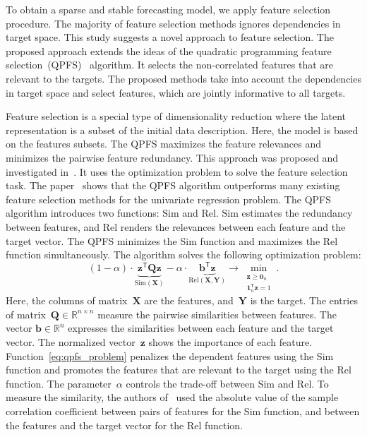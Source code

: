 \documentclass[preprint,authoryear,12pt]{elsarticle}
\theoremstyle{definition}
\newcommand{\bz}{\mathbf{z}}
\newcommand{\bb}{\mathbf{b}}
\newcommand{\bY}{\mathbf{Y}}
\newcommand{\bX}{\mathbf{X}}
\newcommand{\bQ}{\mathbf{Q}}
\newcommand{\bbR}{\mathbb{R}}
\newcommand{\T}{\mathsf{T}}
\newcommand{\bnu}{\boldsymbol{\nu}}
\newcommand{\bOne}{\boldsymbol{1}}
\newcommand{\bZero}{\boldsymbol{0}}
\begin{document}
To obtain a sparse and stable forecasting model, we apply feature selection procedure. The majority of feature selection methods ignores dependencies in target space. This study suggests a novel approach to feature selection. The proposed approach extends the ideas of the quadratic programming feature selection~(QPFS)~\citep{rodriguez2010quadratic} algorithm. It selects the non-correlated features that are relevant to the targets.  The proposed methods take into account the dependencies in target space and select features, which are jointly informative to all targets.
 
Feature selection is a special type of dimensionality reduction where the latent representation is a subset of the initial data description. 
Here, the model is based on the features subsets. 
The QPFS maximizes the feature relevances and minimizes the pairwise feature redundancy. 
This approach was proposed and investigated in~\citep{ding2005minimum,yamada2014high}.
It uses the optimization problem to solve the feature selection task. The paper~\citep{katrutsa2017comprehensive} shows that the QPFS algorithm outperforms many existing feature selection methods for the univariate regression problem. 
The QPFS algorithm introduces two functions: $\text{Sim}$ and $\text{Rel}$.
$\text{Sim}$ estimates the redundancy between features, and $\text{Rel}$ renders the relevances between each feature and the target vector.
The QPFS minimizes the Sim function and maximizes the Rel function simultaneously.
The algorithm solves the following optimization problem:
\begin{equation}
(1 - \alpha) \cdot \underbrace{\bz^{\T} \bQ \bz}_{\text{Sim}(\bX)} - \alpha \cdot \underbrace{ \bb^{\T} \bz}_{\text{Rel} (\bX, \bY)}%
\rightarrow \min_{\substack{\bz \geq \bZero_n \\ \bOne_n^{\T} \bz=1}}.
\label{eq:qpfs_problem}
\end{equation}
Here, the columns of matrix~$\bX$ are the features, and~$\bY$ %
is the target. 
The entries of matrix~$\bQ \in \bbR^{n \times n}$ measure the pairwise similarities between features.
The vector $\bb \in \bbR^n$ expresses the similarities between each feature and the target vector.
The normalized vector~$\bz$ shows the importance of each feature.
Function~\eqref{eq:qpfs_problem} penalizes the dependent features using the Sim function and promotes the features that are relevant to the target using the Rel function.
The parameter~$\alpha$ controls the trade-off between Sim and Rel.
To measure the similarity, the authors of~\citep{rodriguez2010quadratic} used the absolute value of the sample correlation coefficient between pairs of features for the Sim function, and between the features and the target vector for the Rel function.
\end{document}
